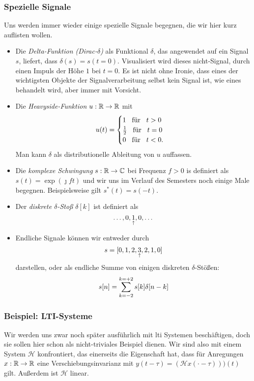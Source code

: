 \subsubsection{Spezielle Signale}
%
Uns werden immer wieder einige spezielle Signale begegnen, die wir hier kurz auflisten wollen.
\begin{itemize}
    \item Die \emph{Delta-Funktion (Dirac-$\delta$)} als Funktional $\delta$, das angewendet auf ein Signal $s$, liefert, dass $\delta(s) = s(t = 0)$. Visualisiert wird dieses nicht-Signal, durch einen Impuls der H\"ohe $1$ bei $t = 0$. Es ist nicht ohne Ironie, dass eines der wichtigsten Objekte der Signalverarbeitung selbst kein Signal ist, wie eines behandelt wird, aber immer mit Vorsicht.
    \item Die \emph{Heavyside-Funktion} $u : \mathbb{R} \rightarrow \mathbb{R}$ mit
    \[
        u(t) = \begin{cases}
            1 {\hspace{3mm} \text{f\"ur} \hspace{3mm}} t>0 \\
            \frac{1}{2} {\hspace{3mm} \text{f\"ur} \hspace{3mm}} t = 0 \\
            0 {\hspace{3mm} \text{f\"ur} \hspace{3mm}} t < 0.
        \end{cases}
    \]
    Man kann $\delta$ als distributionelle Ableitung von $u$ auffassen.
    \item Die \emph{komplexe Schwingung} $s : \mathbb{R} \rightarrow \mathbb{C}$ bei Frequenz $f > 0$ is definiert als 
        $s(t) = \exp(\jmath f t)$
    und wir uns im Verlauf des Semesters noch einige Male begegnen. Beispielsweise gilt $s^\ast(t) = s(-t)$.
    \item Der \emph{diskrete $\delta$-Sto\ss{}} $\delta[k]$ ist definiert als
    \[\dots, 0, \underset{\uparrow}{1}, 0, \dots\]
    \item Endliche Signale k\"onnen wir entweder durch
    \[
        s = [0,1,2,\underset{\uparrow}{3},2,1,0]
    \]
    darstellen, oder als endliche Summe von einigen diskreten $\delta$-St\"o\ss{}en:
    \[
        s[n] = {\sum\limits_{k=-2}^{k=+2}{s}}[k] \delta[n - k]
    \]
\end{itemize}
%
%
\subsubsection{Beispiel: LTI-Systeme}
Wir werden uns zwar noch sp\"ater ausf\"uhrlich mit \gls{lti} Systemen besch\"aftigen, doch sie sollen hier schon als nicht-triviales Beispiel dienen.
Wir sind also mit einem System $\mathcal{H}$ konfrontiert, das einerseits die Eigenschaft hat, dass 
f\"ur Anregungen $x : \mathbb{R} \rightarrow \mathbb{R}$ eine Verschiebungsinvarianz mit $y(t - \tau) = (\mathcal{H}x(\cdot  - \tau)))(t)$ gilt. Au\ss{}erdem ist $\mathcal{H}$ linear.

